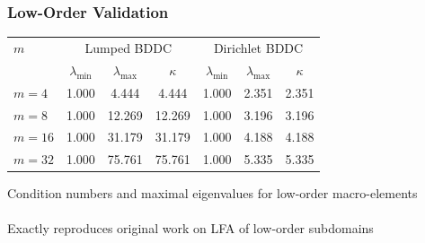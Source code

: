 \documentclass{beamer}
\begin{document}

\begin{frame}
\begin{center}
\frametitle{Low-Order Validation}

\begin{table}[ht!]
\begin{center}
\begin{tabular}{l ccc ccc}
  \toprule
  $m$  &  \multicolumn{3}{c}{Lumped BDDC}  &  \multicolumn{3}{c}{Dirichlet BDDC}  \\
                      &  $\lambda_{\min}$  &  $\lambda_{\max}$  &  $\kappa$ & $\lambda_{\min}$  &  $\lambda_{\max}$ & $\kappa$  \\
  \toprule
  $m = 4$   &  1.000  &   4.444  &   4.444  &  1.000  &  2.351  &  2.351  \\
  $m = 8$   &  1.000  &  12.269  &  12.269  &  1.000  &  3.196  &  3.196  \\
  $m = 16$  &  1.000  &  31.179  &  31.179  &  1.000  &  4.188  &  4.188  \\
  $m = 32$  &  1.000  &  75.761  &  75.761  &  1.000  &  5.335  &  5.335  \\
  \bottomrule
\end{tabular}
\end{center}
\label{table:macro_element_bddc}
\end{table}
{\small Condition numbers and maximal eigenvalues for low-order macro-elements}\\

~\\

Exactly reproduces original work on LFA of low-order subdomains

\end{center}
\end{frame}

\end{document}
